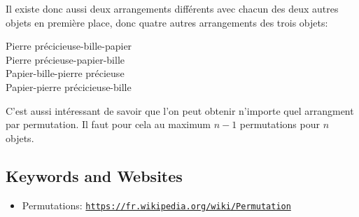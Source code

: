 \documentclass[a4paper,11pt]{report}
\makeatletter
\renewenvironment{adjustwidth}[2]{%
    \begin{list}{}{%
    \partopsep\z@%
    \topsep\z@%
    \listparindent\parindent%
    \parsep\parskip%
    \@ifmtarg{#1}{\setlength{\leftmargin}{\z@}}%
                 {\setlength{\leftmargin}{#1}}%
    \@ifmtarg{#2}{\setlength{\rightmargin}{\z@}}%
                 {\setlength{\rightmargin}{#2}}%
    }
    \item[]}{\end{list}}
\newcommand{\BrochureUrlText}[1]{\texttt{#1}}
\makeatother
\begin{document}
Il existe donc aussi deux arrangements différents avec chacun des deux autres objets en première place, donc quatre autres arrangements des trois objets:

\begin{adjustwidth}{1.5em}{0em}
Pierre précicieuse-bille-papier  \\
Pierre précieuse-papier-bille    \\
Papier-bille-pierre précieuse    \\
Papier-pierre précicieuse-bille
\end{adjustwidth}

C’est aussi intéressant de savoir que l’on peut obtenir n’importe quel arrangment par permutation. Il faut pour cela au maximum ${n-1}$ permutations pour ${n}$ objets.

{\raggedright

\subsection*{Keywords and Websites}

\begin{itemize}
  \item Permutations: \href{https://fr.wikipedia.org/wiki/Permutation}{\BrochureUrlText{https://fr.wikipedia.org/wiki/Permutation}}
\end{itemize}


}
\end{document}
